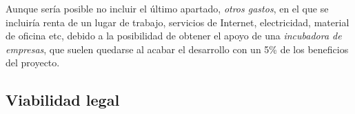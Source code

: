 Aunque sería posible no incluir el último apartado, \textit{otros gastos}, en el que se incluiría renta de un lugar de trabajo, servicios de Internet, electricidad, material de oficina etc, debido a la posibilidad de obtener el apoyo de una \textit{incubadora de empresas}, que suelen quedarse al acabar el desarrollo con un 5\% de los beneficios del proyecto.

\subsection{Viabilidad legal}


